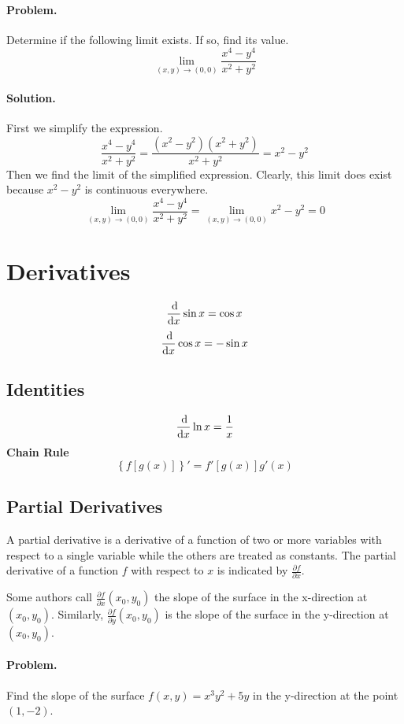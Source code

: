 \documentclass[oneside]{book}
\newcommand*\reciprocal[1]{\frac{1}{#1}}
\begin{document}
\paragraph{Problem.}
Determine if the following limit exists. If so, find its value.
\[\lim_{\left(x, y\right) \rightarrow \left(0, 0\right)} \frac{x^4 - y^4}{x^2 + y^2}\]
\paragraph{Solution.}
First we simplify the expression.
\[\frac{x^4 - y^4}{x^2 + y^2} = \frac{\left(x^2 - y^2\right) \left(x^2 + y^2\right)}{x^2 + y^2} = x^2 - y^2\]
Then we find the limit of the simplified expression. Clearly, this limit does
exist because \(x^2 - y^2\) is continuous everywhere.
\[\lim_{\left(x, y\right) \rightarrow \left(0, 0\right)}{\frac{x^4 - y^4}{x^2 + y^2}}
= \lim_{\left(x, y\right) \rightarrow \left(0, 0\right)} x^2 - y^2 = 0\]

\section{Derivatives}
\[\frac{\dif}{\dif x} \sin x = \cos x\]
\[\frac{\dif}{\dif x} \cos x = -\sin x\]

\subsection{Identities}
\[\frac{\dif}{\dif x} \ln x = \reciprocal{x}\]
\textbf{Chain Rule}
\[\left\{f\left[g\left(x\right)\right]\right\}'
= f'\left[g\left(x\right)\right] g'\left(x\right)\]

\subsection{Partial Derivatives}
A partial derivative is a derivative of a function of two or more variables
with respect to a single variable while the others are treated as constants.
The partial derivative of a function \(f\) with respect to \(x\) is indicated by
\(\frac{\partial f}{\partial x}\).

Some authors call \(\frac{\partial f}{\partial x}\left(x_0, y_0\right)\) the
slope of the surface in the x-direction at \(\left(x_0, y_0\right)\).
Similarly, \(\frac{\partial f}{\partial y}\left(x_0, y_0\right)\) is the slope
of the surface in the y-direction at \(\left(x_0, y_0\right)\).

\paragraph{Problem.}
Find the slope of the surface \(f(x, y) = x^{3}y^{2} + 5y\) in the y-direction at the point \((1, -2)\).
\end{document}
